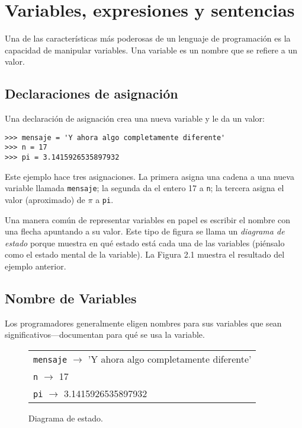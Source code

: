 
\chapter{Variables, expresiones y sentencias}
Una de las características más poderosas de un lenguaje de programación es la capacidad de manipular variables. Una variable es un nombre que se refiere a un valor.

\section{Declaraciones de asignación}

Una declaración de asignación crea una nueva variable y le da un valor:

\begin{verbatim}
>>> mensaje = 'Y ahora algo completamente diferente'
>>> n = 17
>>> pi = 3.1415926535897932
\end{verbatim}

Este ejemplo hace tres asignaciones. La primera asigna una cadena a una nueva variable llamada \texttt{mensaje}; la segunda da el entero 17 a \texttt{n}; la tercera asigna el valor (aproximado) de $\pi$ a \texttt{pi}.

Una manera común de representar variables en papel es escribir el nombre con una flecha apuntando a su valor. Este tipo de figura se llama un \textit{diagrama de estado} porque muestra en qué estado está cada una de las variables (piénsalo como el estado mental de la variable). La Figura 2.1 muestra el resultado del ejemplo anterior.

\section{Nombre de Variables}
Los programadores generalmente eligen nombres para sus variables que sean significativos—documentan para qué se usa la variable.

\begin{figure}[h]
\centering
\begin{tabular}{|l|}
\hline
\texttt{mensaje} $\longrightarrow$ 'Y ahora algo completamente diferente' \\
\texttt{n} $\longrightarrow$ 17 \\
\texttt{pi} $\longrightarrow$ 3.1415926535897932 \\
\hline
\end{tabular}
\caption{Diagrama de estado.}
\label{fig:diagrama-estado}
\end{figure}

